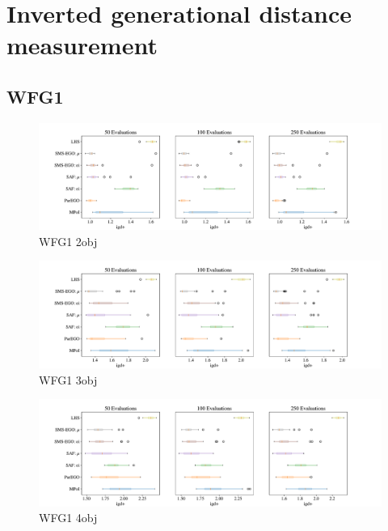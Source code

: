 \documentclass[
dvipsnames, table,   %
format=acmsmall,     %
anonymous=true,      %
authorversion=false, %
]{acmart}
\begin{document}
\section{Inverted generational distance measurement}
\subsection{WFG1}
\begin{figure}[h]
    \centering
    \includegraphics[width=\textwidth]{figures/wfg1_2obj_3dim_igd_boxplot.pdf}
    \caption{WFG1 2obj}
    \label{fig:boxplot WFG1_2obj_3dim}
\end{figure}

\begin{figure}[h]
    \centering
    \includegraphics[width=\textwidth]{figures/wfg1_3obj_4dim_igd_boxplot.pdf}
    \caption{WFG1 3obj}
    \label{fig:boxplot WFG1_3obj_4dim}
\end{figure}

\begin{figure}[h]
    \centering
    \includegraphics[width=\textwidth]{figures/wfg1_4obj_5dim_igd_boxplot.pdf}
    \caption{WFG1 4obj}
    \label{fig:boxplot WFG1_4obj_5dim}
\end{figure}
\clearpage
\end{document}

